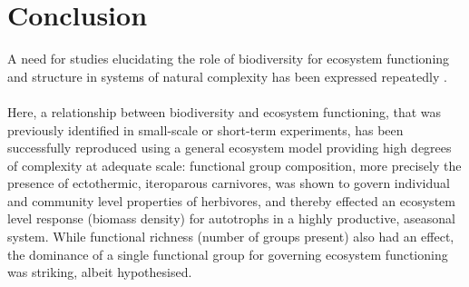 \chapter{Conclusion}
A need for studies elucidating the role of biodiversity for ecosystem functioning and structure in systems of natural complexity has been expressed repeatedly \citep[e.g.][]{Hooper2012,Naeem2012,Tilman2014}.\\\\
Here, a relationship between biodiversity and ecosystem functioning, that was previously identified in small-scale or short-term experiments, has been successfully reproduced using a general ecosystem model providing high degrees of complexity at adequate scale:
functional group composition, more precisely the presence of ectothermic, iteroparous carnivores, was shown to govern individual and community level  properties of herbivores, and thereby effected an ecosystem level response (biomass density) for autotrophs in a highly productive, aseasonal system. While functional richness (number of groups present) also had an effect, the dominance of a single functional group for governing ecosystem functioning was striking, albeit hypothesised.  \\

